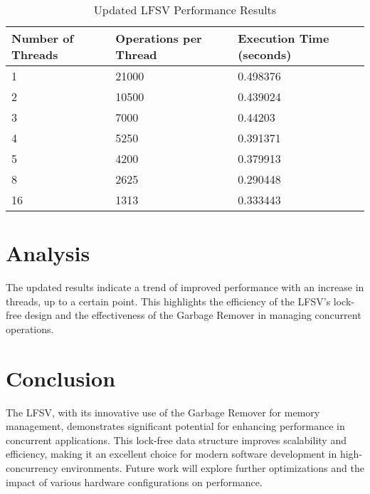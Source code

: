 \documentclass{article}
\begin{document}
\begin{table}[h]
\centering
\begin{tabular}{|l|l|l|}
\hline
\textbf{Number of Threads} & \textbf{Operations per Thread} & \textbf{Execution Time (seconds)} \\ \hline
1                          & 21000                          & 0.498376                          \\ \hline
2                          & 10500                          & 0.439024                          \\ \hline
3                          & 7000                           & 0.44203                           \\ \hline
4                          & 5250                           & 0.391371                          \\ \hline
5                          & 4200                           & 0.379913                          \\ \hline
8                          & 2625                           & 0.290448                          \\ \hline
16                         & 1313                           & 0.333443                          \\ \hline
\end{tabular}
\caption{Updated LFSV Performance Results}
\label{table:updated_performance}
\end{table}

\section{Analysis}
The updated results indicate a trend of improved performance with an increase in threads, up to a certain point. This highlights the efficiency of the LFSV's lock-free design and the effectiveness of the Garbage Remover in managing concurrent operations. 

\section{Conclusion}
The LFSV, with its innovative use of the Garbage Remover for memory management, demonstrates significant potential for enhancing performance in concurrent applications. This lock-free data structure improves scalability and efficiency, making it an excellent choice for modern software development in high-concurrency environments. Future work will explore further optimizations and the impact of various hardware configurations on performance.
\end{document}
